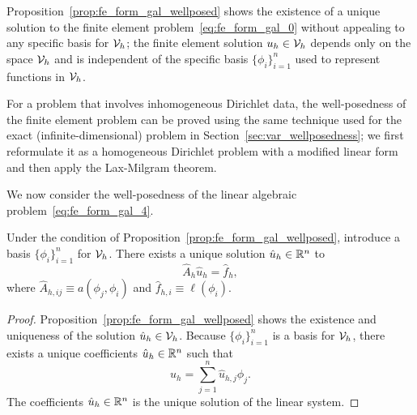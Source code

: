Proposition~\ref{prop:fe_form_gal_wellposed} shows the existence of a unique solution to the finite element problem~\eqref{eq:fe_form_gal_0} without appealing to any specific basis for $\mathcal{V}_h$; the finite element solution $u_h \in \mathcal{V}_h$ depends only on the space $\mathcal{V}_h$ and is independent of the specific basis $\{ \phi_i \}_{i=1}^n$ used to represent functions in $\mathcal{V}_h$.

For a problem that involves inhomogeneous Dirichlet data, the well-posedness of the finite element problem can be proved using the same technique used for the exact (infinite-dimensional) problem in Section~\ref{sec:var_wellposedness}; we first reformulate it as a homogeneous Dirichlet problem with a modified linear form and then apply the Lax-Milgram theorem.

We now consider the well-posedness of the linear algebraic problem~\ref{eq:fe_form_gal_4}.
\begin{proposition}
  Under the condition of Proposition~\ref{prop:fe_form_gal_wellposed}, introduce a basis $\{\phi_i\}_{i=1}^n$ for $\mathcal{V}_h$. There exists a unique solution $\hat u_h \in \mathbb{R}^n$ to 
  \begin{equation*}
    \hat A_h \hat u_h = \hat f_h,
  \end{equation*}
  where $\hat A_{h,ij} \equiv a(\phi_j, \phi_i)$ and $\hat f_{h,i} \equiv \ell(\phi_i)$.
  \begin{proof}
    Proposition~\ref{prop:fe_form_gal_wellposed} shows the existence and uniqueness of the solution $\hat u_h \in \mathcal{V}_h$.  Because $\{\phi_i\}_{i=1}^n$ is a basis for $\mathcal{V}_h$, there exists a unique coefficients $\hat u_h \in \mathbb{R}^n$ such that
    \begin{equation*}
      u_h = \sum_{j=1}^n \hat u_{h,j} \phi_j.
    \end{equation*}
    The coefficients $\hat u_h \in \mathbb{R}^n$ is the unique solution of the linear system.
  \end{proof}
\end{proposition}

